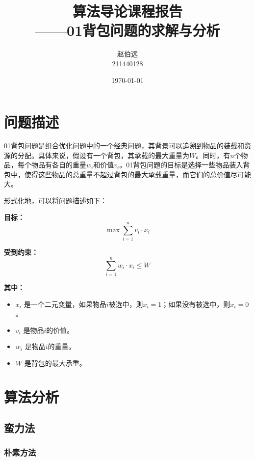 \documentclass[UTF8,titlepage]{ctexart}
\numberwithin{figure}{section}
\begin{document}
\title{算法导论课程报告 \\ \large{——01背包问题的求解与分析}}
\author{赵伯远 \\ 211440128}
\date{\today}
\maketitle
\tableofcontents
\clearpage

\section{问题描述}

01背包问题是组合优化问题中的一个经典问题，其背景可以追溯到物品的装载和资源的分配。具体来说，假设有一个背包，其承载的最大重量为\( W \)。同时，有\( n \)个物品，每个物品有各自的重量\( w_i \)和价值\( v_i \)。01背包问题的目标是选择一些物品装入背包中，使得这些物品的总重量不超过背包的最大承载重量，而它们的总价值尽可能大。

形式化地，可以将问题描述如下：

\textbf{目标：}
\begin{equation}
    \max \sum_{i=1}^{n} v_i \cdot x_i
\end{equation}

\textbf{受到约束：}
\begin{equation}
    \sum_{i=1}^{n} w_i \cdot x_i \leq W
\end{equation}

\textbf{其中：}
\begin{itemize}
    \item \( x_i \) 是一个二元变量，如果物品\( i \)被选中，则\( x_i = 1 \)；如果没有被选中，则\( x_i = 0 \)。
    \item \( v_i \) 是物品\( i \)的价值。
    \item \( w_i \) 是物品\( i \)的重量。
    \item \( W \) 是背包的最大承重。
\end{itemize}

\section{算法分析}

\subsection{蛮力法}

\subsubsection{朴素方法}
\end{document}
